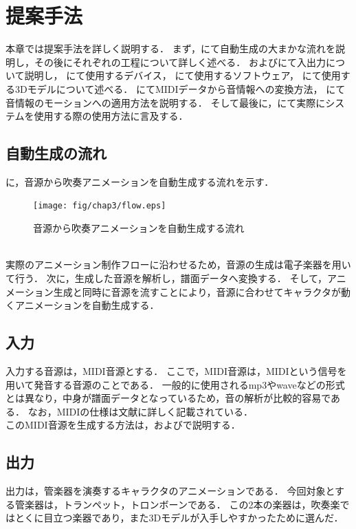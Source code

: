 \chapter{提案手法} \label{chap:algorithm}
本章では提案手法を詳しく説明する．
まず，にて自動生成の大まかな流れを説明し，その後にそれぞれの工程について詳しく述べる．
およびにて入出力について説明し，
にて使用するデバイス，
にて使用するソフトウェア，
にて使用する3Dモデルについて述べる．
にてMIDIデータから音情報への変換方法，
にて音情報のモーションへの適用方法を説明する．
そして最後に，にて実際にシステムを使用する際の使用方法に言及する．

\section{自動生成の流れ} \label{sec:flow}
に，音源から吹奏アニメーションを自動生成する流れを示す．\\
\begin{figure}[!h]
	\centering
	\texttt{[image: fig/chap3/flow.eps]}
	\caption{音源から吹奏アニメーションを自動生成する流れ}
	\label{fig:flow}
\end{figure}
\\
\indent
実際のアニメーション制作フローに沿わせるため，音源の生成は電子楽器を用いて行う．
次に，生成した音源を解析し，譜面データへ変換する．
そして，アニメーション生成と同時に音源を流すことにより，音源に合わせてキャラクタが動くアニメーションを自動生成する．

\section{入力} \label{sec:input}
入力する音源は，MIDI音源とする．
ここで，MIDI音源は，MIDIという信号を用いて発音する音源のことである．
一般的に使用されるmp3やwaveなどの形式とは異なり，中身が譜面データとなっているため，音の解析が比較的容易である．
なお，MIDIの仕様は文献\cite{midi}に詳しく記載されている．\\
\indent
このMIDI音源を生成する方法は，およびで説明する．

\section{出力} \label{sec:output}
出力は，管楽器を演奏するキャラクタのアニメーションである．
今回対象とする管楽器は，トランペット，トロンボーンである．
この2本の楽器は，吹奏楽ではとくに目立つ楽器であり，また3Dモデルが入手しやすかったために選んだ．

